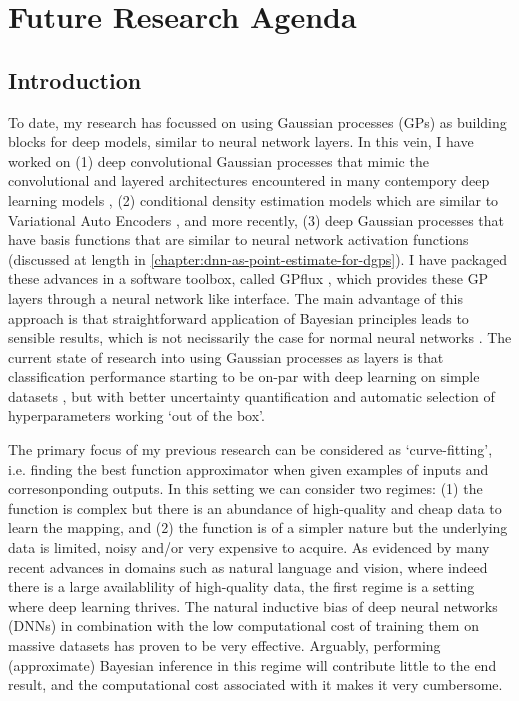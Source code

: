 \graphicspath{{Chapter5/Figs/}}

\chapter{Future Research Agenda}
\label{chapter:future-research}

\section{Introduction}
To date, my research has focussed on using Gaussian processes (GPs) as building blocks for deep models, similar to neural network layers. In this vein, I have worked on (1) deep convolutional Gaussian processes that mimic the convolutional and layered architectures encountered in many contempory deep learning models \citep{Dutordoir2020convolutional}, (2) conditional density estimation models which are similar to Variational Auto Encoders \citep{dutordoir2018cde,Salimbeni2019}, and more recently, (3) deep Gaussian processes that have basis functions that are similar to neural network activation functions \citep{dutordoir2021deep} (discussed at length in \cref{chapter:dnn-as-point-estimate-for-dgps}). I have packaged these advances in a software toolbox, called GPflux \citep{dutordoir2021gpflux}, which provides these GP layers through a neural network like interface. The main advantage of this approach is that straightforward application of Bayesian principles leads to sensible results, which is not necissarily the case for normal neural networks \citep{wenzel2020good}. The current state of research into using Gaussian processes as layers is that classification performance starting to be on-par with deep learning on simple datasets \citep{dutordoir2018cde}, but with better uncertainty quantification and automatic selection of hyperparameters working `out of the box'.

The primary focus of my previous research can be considered as `curve-fitting', i.e. finding the best function approximator when given examples of inputs and corresonponding outputs. In this setting we can consider two regimes: (1) the function is complex but there is an abundance of high-quality and cheap data to learn the mapping, and (2) the function is of a simpler nature but the underlying data is limited, noisy and/or very expensive to acquire. As evidenced by many recent advances in domains such as natural language and vision, where indeed there is a large availablility of high-quality data, the first regime is a setting where deep learning thrives. The natural inductive bias of deep neural networks (DNNs) in combination with the low computational cost of training them on massive datasets has proven to be very effective. Arguably, performing (approximate) Bayesian inference in this regime will contribute little to the end result, and the computational cost associated with it makes it very cumbersome. 

